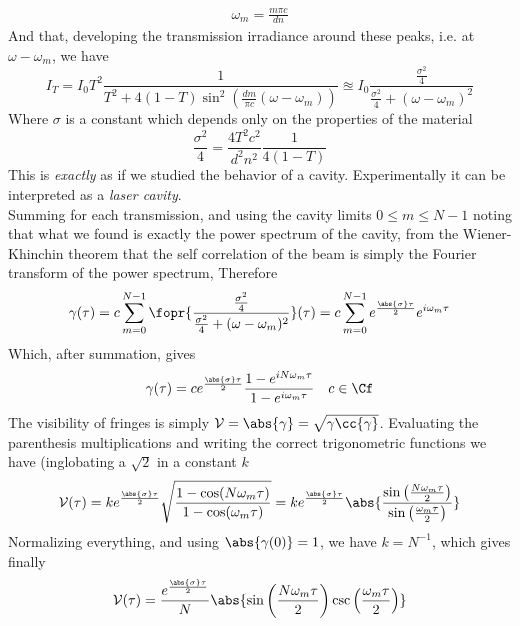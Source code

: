 \documentclass[../electromagnetism.tex]{subfiles}
\begin{document}
\begin{equation*}
	\begin{aligned}
		\omega_m=\frac{m\pi c}{dn}
	\end{aligned}
\end{equation*}
And that, developing the transmission irradiance around these peaks, i.e. at $\omega-\omega_m$, we have
\begin{equation}
	I_T=I_0T^2\frac{1}{T^2+4(1-T)\sin^2\left( \frac{dm}{\pi c}(\omega-\omega_m) \right)}\approxeq I_0\frac{\frac{\sigma^2}{4}}{\frac{\sigma^2}{4}+(\omega-\omega_m)^2}
	\label{eq:transintdifffreq.mbi}
\end{equation}
Where $\sigma$ is a constant which depends only on the properties of the material
\begin{equation*}
	\frac{\sigma^2}{4}=\frac{4T^2c^2}{d^2n^2}\frac{1}{4(1-T)}
\end{equation*}
This is \textit{exactly} as if we studied the behavior of a cavity. Experimentally it can be interpreted as a \textit{laser cavity}.\\
Summing for each transmission, and using the cavity limits $0\le m\le N-1$ noting that what we found is exactly the power spectrum of the cavity, from the Wiener-Khinchin theorem that the self correlation of the beam is simply the Fourier transform of the power spectrum, Therefore
\begin{equation*}
	\gamma(\tau)=c\sum_{m=0}^{N-1}\fopr{\frac{\frac{\sigma^2}{4}}{\frac{\sigma^2}{4}+(\omega-\omega_m)^2}}(\tau)=c\sum^{N-1}_{m=0}e^{\frac{\abs{\sigma}\tau}{2}}e^{i\omega_m\tau}
\end{equation*}
Which, after summation, gives
\begin{equation}
	\gamma(\tau)=ce^{\frac{\abs{\sigma}\tau}{2}}\frac{1-e^{iN\omega_m\tau}}{1-e^{i\omega_m\tau}}\quad c\in\Cf
	\label{eq:selfcorrlasercavity.mbi}
\end{equation}
The visibility of fringes is simply $\mathcal{V}=\abs{\gamma}=\sqrt{\gamma\cc{\gamma}}$. Evaluating the parenthesis multiplications and writing the correct trigonometric functions we have (inglobating a $\sqrt{2}$ in a constant $k$
\begin{equation}
	\mathcal{V}(\tau)=ke^{\frac{\abs{\sigma}\tau}{2}}\sqrt{\frac{1-\cos(N\omega_m\tau)}{1-\cos(\omega_m\tau)}}=ke^{\frac{\abs{\sigma}\tau}{2}}\abs{\frac{\sin\left( \frac{N\omega_m\tau}{2} \right)}{\sin\left( \frac{\omega_m\tau}{2} \right)}}
	\label{eq:visnonnorm.mbi}
\end{equation}
Normalizing everything, and using $\abs{\gamma(0)}=1$, we have $k=N^{-1}$, which gives finally
\begin{equation}
	\mathcal{V}(\tau)=\frac{e^{\frac{\abs{\sigma}\tau}{2}}}{N}\abs{\sin\left( \frac{N\omega_m\tau}{2} \right)\csc\left( \frac{\omega_m\tau}{2} \right)}
	\label{eq:visibilitylasercavity.mbi}
\end{equation}
\end{document}
